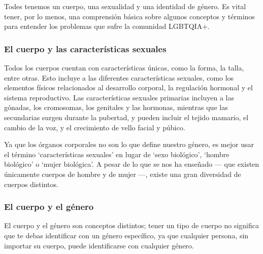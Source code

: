 \documentclass[12pt,openany]{book}
\begin{document}
Todes tenemos un cuerpo, una sexualidad y una identidad de género. Es vital tener, por lo menos, una comprensión básica sobre algunos conceptos y términos para entender los problemas que sufre la comunidad LGBTQIA+.

\subsubsection*{El cuerpo y las características sexuales}

Todos los cuerpos cuentan con características únicas, como la forma, la talla, entre otras. Esto incluye a las diferentes características sexuales, como los elementos físicos relacionados al desarrollo corporal, la regulación hormonal y el sistema reproductivo. Las características sexuales primarias incluyen a las gónadas, los cromosomas, los genitales y las hormonas, mientras que las secundarias surgen durante la pubertad, y pueden incluir el tejido mamario, el cambio de la voz, y el crecimiento de vello facial y púbico.

Ya que los órganos corporales no son lo que define nuestro género, es mejor usar el término `características sexuales' en lugar de `sexo biológico', `hombre biológico' o `mujer biológica'. A pesar de lo que se nos ha enseñado --- que existen únicamente cuerpos de hombre y de mujer ---, existe una gran diversidad de cuerpos distintos.

\begin{figure}[h]
    \centering
\end{figure}

\subsubsection*{El cuerpo y el género}

El cuerpo y el género son conceptos distintos; tener un tipo de cuerpo no significa que te debas identificar con un género específico, ya que cualquier persona, sin importar su cuerpo, puede identificarse con cualquier género.
\end{document}
